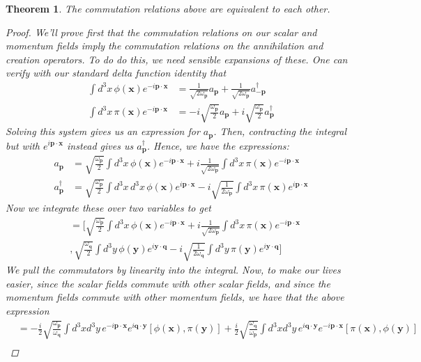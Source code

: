\documentclass[11pt, oneside]{article}   	%
\theoremstyle{newline}
\theoremstyle{newline}
\newtheorem*{thm}{Theorem}
\theoremstyle{newline}
\theoremstyle{newline}
\theoremstyle{newline}
\newcommand{\ann}[1]{a_{ \mathbf{ #1 }}}
\newcommand{\crea}[1]{a^\dagger_{ \mathbf{ #1 }}}
\newcommand{\mode}[ 1]{ e^{ i \mathbf{ #1 } \cdot \mathbf{x} }}
\newcommand{\nmode}[1]{ e^{  - i \mathbf{ #1 } \cdot \mathbf{x} }}
\newcommand{\freq}[1]{\omega_\mathbf{ #1} }
\newcommand{\scal}[1]{\phi ( \mathbf{ #1 })}
\newcommand{\mom}[1]{ \pi (\mathbf{ #1 })}
\begin{document}
\begin{thm} 
The commutation relations above are equivalent to each other. 

\begin{proof} 
We'll prove first that the commutation relations on our scalar and momentum fields imply the commutation relations on the annihilation and creation operators. To do do this, we need sensible expansions of these. One can verify with our standard delta function identity that 
\begin{align*} 
\int d^3 x \,  \scal{x} \nmode{p}  &= \frac{ 1}{ \sqrt{ 2 \freq{p } } } \ann{p} +  \frac{ 1}{ \sqrt{ 2 \freq{p } } } \crea{ -p} \\
\int d^3 x \,  \mom{x} \nmode{p} &=  - i \sqrt{ \frac{ \freq{ p}}{ 2} } \ann{p}  + i \sqrt{ \frac{ \freq{ p}}{ 2} }\crea{ p } 
\end{align*} 
Solving this system gives us an expression for $\ann{ p} $. Then, contracting the integral but with $ \mode{p} $ instead gives us $\crea{ p }$. Hence, we have the expressions: 
\begin{align*} 
\ann{p }  &= \sqrt{ \frac{ \freq{ p } }{2} } \int d^3 x   \, \scal{ x} \nmode{ p }  + i \frac{ 1} { \sqrt { 2 \freq{p}}}  \int d^3 x \, \mom{x} \nmode{ p }  \\
\crea{p} &= \sqrt{ \frac{ \freq{p}}{ 2} } \int d^3 x \, d^3 x \, \scal{x} \mode{p}  - i \sqrt{ \frac{ 1}{ 2 \freq{ p }}} \int d^3 x \, \mom{x} \mode{ p } 
\end{align*} 
Now we integrate these over two variables to get 
\begin{align*} 
[\ann{p}, \crea{q} ] & = [  \sqrt{ \frac{ \freq{ p } }{2} } \int d^3 x   \, \scal{ x} \nmode{ p }  + i \frac{ 1} { \sqrt { 2 \freq{p}}}  \int d^3 x \, \mom{x} \nmode{ p }  \\
&, \sqrt{ \frac{ \freq{q}}{ 2} } \int d^3 y \, \scal{y} e^{  i \mathbf{y } \cdot \mathbf{q} }  - i \sqrt{ \frac{ 1}{ 2 \freq{ q }}} \int d^3 y \, \mom{y} e^{i \mathbf{ y} \cdot \mathbf{ q} }  ] 
\end{align*} 
We pull the commutators by linearity into the integral. Now, to make our lives easier, since the scalar fields commute with other scalar fields, and since the momentum fields commute with other momentum fields, we have that the above expression 
\begin{align*} 
[\ann{p}, \crea{q} ]  & =  - \frac{ i }{ 2} \sqrt{ \frac{ \freq{p}}{ \freq {q} } } \int d^3 x d^3 y \,  \nmode{p} e^{ i \mathbf{q} \cdot \mathbf{ y } } [ \scal{x}, \mom{y } ]  + \frac{ i }{ 2} \sqrt { \frac{ \freq{q} } { \freq{p}}} \int d^3 x d^3 y \, e^{ i \mathbf{q} \cdot \mathbf{y } }  \nmode{p} [ \mom { x} , \scal{y} ] \\

\end{align*}
\end{proof}
\end{thm}
\end{document}
